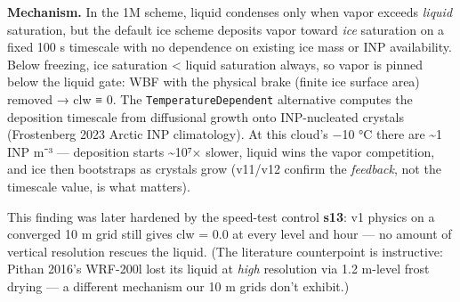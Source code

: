 \documentclass[11pt]{article}
\begin{document}
\textbf{Mechanism.} In the 1M scheme, liquid condenses only when vapor
exceeds \emph{liquid} saturation, but the default ice scheme deposits
vapor toward \emph{ice} saturation on a fixed 100 s timescale with no
dependence on existing ice mass or INP availability. Below freezing, ice
saturation \textless{} liquid saturation always, so vapor is pinned
below the liquid gate: WBF with the physical brake (finite ice surface
area) removed → clw ≡ 0. The \texttt{TemperatureDependent} alternative
computes the deposition timescale from diffusional growth onto
INP-nucleated crystals (Frostenberg 2023 Arctic INP climatology). At
this cloud's −10 °C there are \textasciitilde1 INP m⁻³ --- deposition
starts \textasciitilde10⁷× slower, liquid wins the vapor competition,
and ice then bootstraps as crystals grow (v11/v12 confirm the
\emph{feedback}, not the timescale value, is what matters).

This finding was later hardened by the speed-test control \textbf{s13}:
v1 physics on a converged 10 m grid still gives clw = 0.0 at every level
and hour --- no amount of vertical resolution rescues the liquid. (The
literature counterpoint is instructive: Pithan 2016's WRF-200l lost its
liquid at \emph{high} resolution via 1.2 m-level frost drying --- a
different mechanism our 10 m grids don't exhibit.)
\end{document}
